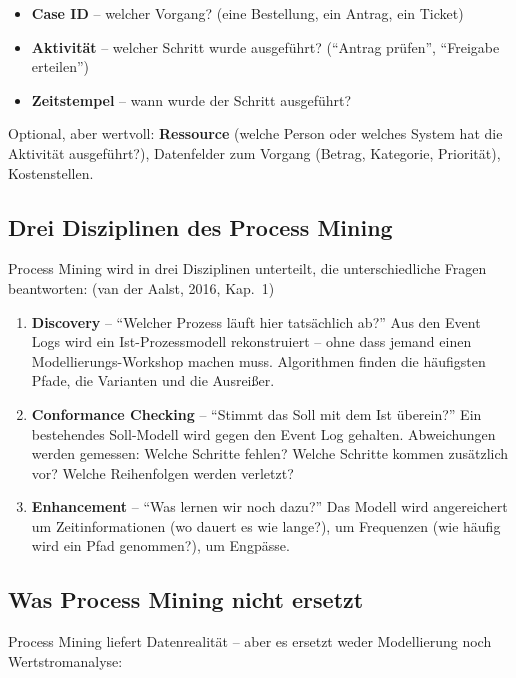 \documentclass[11pt,a4paper,oneside]{article}
\newcommand{\fachbegriff}[1]{\textbf{#1}}
\newcommand{\quelle}[1]{{\footnotesize\color{lpGray}(#1)}}
\begin{document}
\begin{itemize}
  \item \fachbegriff{Case ID} -- welcher Vorgang? (eine Bestellung, ein Antrag, ein Ticket)
  \item \fachbegriff{Aktivität} -- welcher Schritt wurde ausgeführt? (``Antrag prüfen'', ``Freigabe erteilen'')
  \item \fachbegriff{Zeitstempel} -- wann wurde der Schritt ausgeführt?
\end{itemize}

Optional, aber wertvoll: \fachbegriff{Ressource} (welche Person oder welches System hat die Aktivität ausgeführt?), Datenfelder zum Vorgang (Betrag, Kategorie, Priorität), Kostenstellen.

\subsection{Drei Disziplinen des Process Mining}

Process Mining wird in drei Disziplinen unterteilt, die unterschiedliche Fragen beantworten: \quelle{van der Aalst, 2016, Kap.~1}

\begin{enumerate}
  \item \fachbegriff{Discovery} -- ``Welcher Prozess läuft hier tatsächlich ab?'' Aus den Event Logs wird ein Ist-Prozessmodell rekonstruiert -- ohne dass jemand einen Modellierungs-Workshop machen muss. Algorithmen finden die häufigsten Pfade, die Varianten und die Ausreißer.
  \item \fachbegriff{Conformance Checking} -- ``Stimmt das Soll mit dem Ist überein?'' Ein bestehendes Soll-Modell wird gegen den Event Log gehalten. Abweichungen werden gemessen: Welche Schritte fehlen? Welche Schritte kommen zusätzlich vor? Welche Reihenfolgen werden verletzt?
  \item \fachbegriff{Enhancement} -- ``Was lernen wir noch dazu?'' Das Modell wird angereichert um Zeitinformationen (wo dauert es wie lange?), um Frequenzen (wie häufig wird ein Pfad genommen?), um Engpässe.
\end{enumerate}

\subsection{Was Process Mining nicht ersetzt}

Process Mining liefert Datenrealität -- aber es ersetzt weder Modellierung noch Wertstromanalyse:
\end{document}
